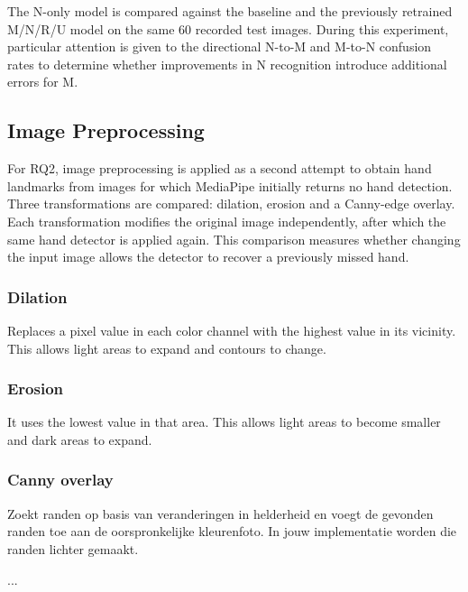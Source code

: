 The N-only model is compared against the baseline and the previously retrained M/N/R/U model on the same 60 recorded test images. During this experiment, particular attention is given to the directional N-to-M and M-to-N confusion rates to determine whether improvements in N recognition introduce additional errors for M.
\subsection{Image Preprocessing}

For RQ2, image preprocessing is applied as a second attempt to obtain hand landmarks from images for which MediaPipe initially returns no hand detection. Three transformations are compared: dilation, erosion and a Canny-edge overlay. Each transformation modifies the original image independently, after which the same hand detector is applied again. This comparison measures whether changing the input image allows the detector to recover a previously missed hand.

    \subsubsection{Dilation}
        Replaces a pixel value in each color channel with the highest value in its vicinity. This allows light areas to expand and contours to change.

    \subsubsection{Erosion}
    	It uses the lowest value in that area. This allows light areas to become smaller and dark areas to expand.

    \subsubsection{Canny overlay}
        Zoekt randen op basis van veranderingen in helderheid en voegt de gevonden randen toe aan de oorspronkelijke kleurenfoto. In jouw implementatie worden die randen lichter gemaakt.




\par\noindent ...\par\medskip
